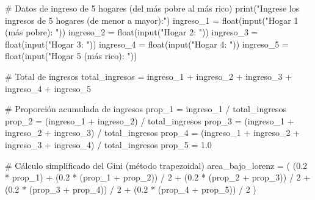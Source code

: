 \documentclass[
  doc,
  floatsintext,
  longtable,
  a4paper,
  nolmodern,
  notxfonts,
  notimes,
  12pt,
  colorlinks=true,linkcolor=blue,citecolor=blue,urlcolor=blue]{apa7}
\newenvironment{Shaded}{\begin{snugshade}}{\end{snugshade}}
\newcommand{\BuiltInTok}[1]{\textcolor[rgb]{0.00,0.23,0.31}{#1}}
\newcommand{\CommentTok}[1]{\textcolor[rgb]{0.37,0.37,0.37}{#1}}
\newcommand{\DecValTok}[1]{\textcolor[rgb]{0.68,0.00,0.00}{#1}}
\newcommand{\FloatTok}[1]{\textcolor[rgb]{0.68,0.00,0.00}{#1}}
\newcommand{\NormalTok}[1]{\textcolor[rgb]{0.00,0.23,0.31}{#1}}
\newcommand{\OperatorTok}[1]{\textcolor[rgb]{0.37,0.37,0.37}{#1}}
\newcommand{\StringTok}[1]{\textcolor[rgb]{0.13,0.47,0.30}{#1}}
\begin{document}
\begin{Shaded}
\begin{Highlighting}[]
\CommentTok{\# Datos de ingreso de 5 hogares (del más pobre al más rico)}
\BuiltInTok{print}\NormalTok{(}\StringTok{"Ingrese los ingresos de 5 hogares (de menor a mayor):"}\NormalTok{)}
\NormalTok{ingreso\_1 }\OperatorTok{=} \BuiltInTok{float}\NormalTok{(}\BuiltInTok{input}\NormalTok{(}\StringTok{"Hogar 1 (más pobre): "}\NormalTok{))}
\NormalTok{ingreso\_2 }\OperatorTok{=} \BuiltInTok{float}\NormalTok{(}\BuiltInTok{input}\NormalTok{(}\StringTok{"Hogar 2: "}\NormalTok{))}
\NormalTok{ingreso\_3 }\OperatorTok{=} \BuiltInTok{float}\NormalTok{(}\BuiltInTok{input}\NormalTok{(}\StringTok{"Hogar 3: "}\NormalTok{))}
\NormalTok{ingreso\_4 }\OperatorTok{=} \BuiltInTok{float}\NormalTok{(}\BuiltInTok{input}\NormalTok{(}\StringTok{"Hogar 4: "}\NormalTok{))}
\NormalTok{ingreso\_5 }\OperatorTok{=} \BuiltInTok{float}\NormalTok{(}\BuiltInTok{input}\NormalTok{(}\StringTok{"Hogar 5 (más rico): "}\NormalTok{))}

\CommentTok{\# Total de ingresos}
\NormalTok{total\_ingresos }\OperatorTok{=}\NormalTok{ ingreso\_1 }\OperatorTok{+}\NormalTok{ ingreso\_2 }\OperatorTok{+}\NormalTok{ ingreso\_3 }\OperatorTok{+}\NormalTok{ ingreso\_4 }\OperatorTok{+}\NormalTok{ ingreso\_5}

\CommentTok{\# Proporción acumulada de ingresos}
\NormalTok{prop\_1 }\OperatorTok{=}\NormalTok{ ingreso\_1 }\OperatorTok{/}\NormalTok{ total\_ingresos}
\NormalTok{prop\_2 }\OperatorTok{=}\NormalTok{ (ingreso\_1 }\OperatorTok{+}\NormalTok{ ingreso\_2) }\OperatorTok{/}\NormalTok{ total\_ingresos}
\NormalTok{prop\_3 }\OperatorTok{=}\NormalTok{ (ingreso\_1 }\OperatorTok{+}\NormalTok{ ingreso\_2 }\OperatorTok{+}\NormalTok{ ingreso\_3) }\OperatorTok{/}\NormalTok{ total\_ingresos}
\NormalTok{prop\_4 }\OperatorTok{=}\NormalTok{ (ingreso\_1 }\OperatorTok{+}\NormalTok{ ingreso\_2 }\OperatorTok{+}\NormalTok{ ingreso\_3 }\OperatorTok{+}\NormalTok{ ingreso\_4) }\OperatorTok{/}\NormalTok{ total\_ingresos}
\NormalTok{prop\_5 }\OperatorTok{=} \FloatTok{1.0}

\CommentTok{\# Cálculo simplificado del Gini (método trapezoidal)}
\NormalTok{area\_bajo\_lorenz }\OperatorTok{=}\NormalTok{ (}
\NormalTok{    (}\FloatTok{0.2} \OperatorTok{*}\NormalTok{ prop\_1)}
    \OperatorTok{+}\NormalTok{ (}\FloatTok{0.2} \OperatorTok{*}\NormalTok{ (prop\_1 }\OperatorTok{+}\NormalTok{ prop\_2)) }\OperatorTok{/} \DecValTok{2}
    \OperatorTok{+}\NormalTok{ (}\FloatTok{0.2} \OperatorTok{*}\NormalTok{ (prop\_2 }\OperatorTok{+}\NormalTok{ prop\_3)) }\OperatorTok{/} \DecValTok{2}
    \OperatorTok{+}\NormalTok{ (}\FloatTok{0.2} \OperatorTok{*}\NormalTok{ (prop\_3 }\OperatorTok{+}\NormalTok{ prop\_4)) }\OperatorTok{/} \DecValTok{2}
    \OperatorTok{+}\NormalTok{ (}\FloatTok{0.2} \OperatorTok{*}\NormalTok{ (prop\_4 }\OperatorTok{+}\NormalTok{ prop\_5)) }\OperatorTok{/} \DecValTok{2}
\NormalTok{)}


\end{Highlighting}
\end{Shaded}
\end{document}
